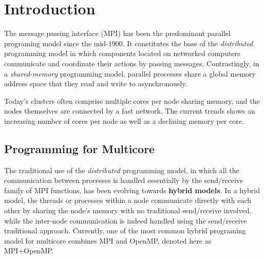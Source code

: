 \section{Introduction}
The message passing interface (MPI) has been the predominant parallel programing model since the mid-1900. It constitutes the base of the \emph{distributed} programming model in which components located on networked computers communicate and coordinate their actions by passing messages. Contrastingly, in a \emph{shared-memory} programming model, parallel processes share a global memory address space that they read and write to asynchronously. 

Today's clusters often comprise multiple cores per node sharing memory, and the nodes themselves are connected by a fast network. The current trends shows an increasing number of cores per node as well as a declining memory per core.

\subsection*{Programming for Multicore}

The traditional use of the \emph{distributed} programming model, in which all the communication between processes is handled essentially by the send/receive family of MPI functions, has been evolving towards \textbf{hybrid models}. In a hybrid model, the threads or processes within a node communicate directly with each other by sharing the node's memory with no traditional send/receive involved, while the inter-node communication is indeed handled using the send/receive traditional approach. Currently, one of the most common hybrid programing model for multicore combines MPI and OpenMP, denoted here as MPI+OpenMP.



